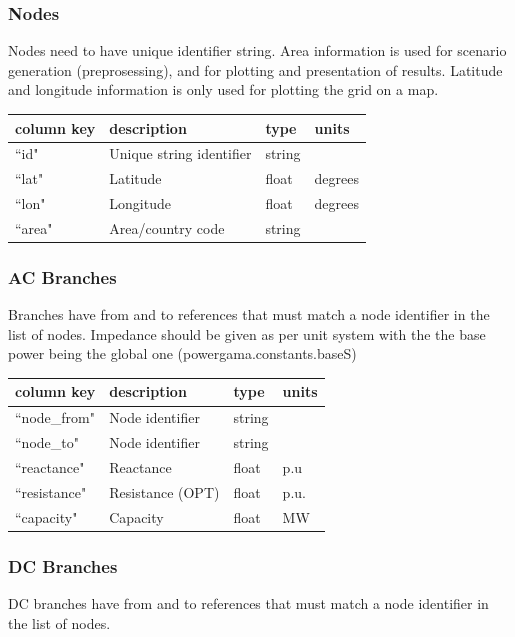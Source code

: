 \documentclass{article}
\begin{document}
\subsubsection{Nodes}
Nodes need to have unique identifier string. Area information is used for scenario generation (preprosessing), and for plotting and presentation of results.
Latitude and longitude information is only used for plotting the grid on a map.

\medskip
\begin{tabular}{llll}
	\hline
	column key & description & type & units \\
	\hline
	``id"	&	Unique string identifier 	& string	& \\
	``lat"	&	Latitude				& float 	& degrees \\
	``lon"	&	Longitude				& float	& degrees \\
	``area" &	Area/country code		& string	& \\
	\hline
\end{tabular}


\subsubsection{AC Branches}
Branches have from and to references that must match a node identifier in the list of nodes.
Impedance should be given as per unit system with the the base power being the global one (powergama.constants.baseS)

\medskip
\begin{tabular}{llll}
	\hline
	column key & description & type & units \\
	\hline
	``node\_from"	&	Node identifier 	& string	& \\
	``node\_to"		&	Node identifier	& string	& \\
	``reactance"	&	Reactance	& float	& p.u \\
	``resistance"	&	Resistance (OPT) & float & p.u. \\
	``capacity"		&	Capacity & float		& MW \\
	\hline
\end{tabular}

\subsubsection{DC Branches}
DC branches have from and to references that must match a node identifier in the list of nodes.
\end{document}
